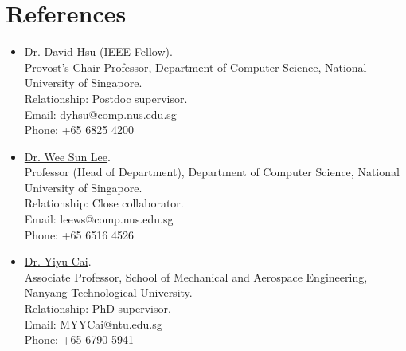 \documentclass[10pt,letterpaper,sans]{moderncv}
\begin{document}
\section{References}
\begin{itemize}
  \item \href{https://www.comp.nus.edu.sg/~dyhsu/}{\underline{Dr. David Hsu (IEEE Fellow)}}.\\
  Provost's Chair Professor, Department of Computer Science, National University of Singapore.\\
  Relationship: Postdoc supervisor.\\
  Email: dyhsu@comp.nus.edu.sg \\
  Phone: +65 6825 4200
  \item \underline{Dr. Wee Sun Lee}.\\
  Professor (Head of Department), Department of Computer Science, National University of Singapore.\\
  Relationship: Close collaborator.\\
  Email: leews@comp.nus.edu.sg \\
  Phone: +65 6516 4526
  \item \underline{Dr. Yiyu Cai}.\\
  Associate Professor, School of Mechanical and Aerospace Engineering, Nanyang Technological University.\\
  Relationship: PhD supervisor.\\
  Email: MYYCai@ntu.edu.sg \\
  Phone: +65 6790 5941
\end{itemize}
\end{document}
